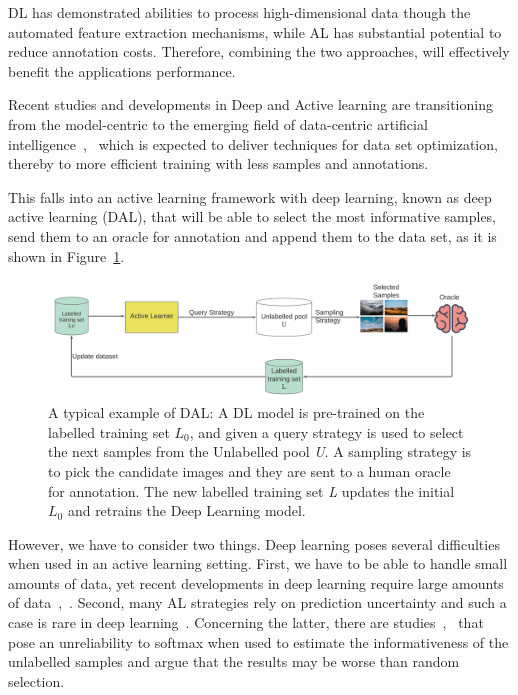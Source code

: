 DL has demonstrated abilities to process high-dimensional data though the automated feature extraction mechanisms, while AL has substantial potential to reduce annotation costs. Therefore, combining the two approaches, will effectively benefit the applications performance.

Recent studies and developments in Deep and Active learning are transitioning from the model-centric to the emerging field of data-centric artificial intelligence~\cite{bosser2020model},~\cite{motamedi2021datacentric} which is expected to deliver techniques for data set optimization, thereby to more efficient training with less samples and annotations. 

This falls into an active learning framework with deep learning, known as deep active learning (DAL), that will be able to select the most informative samples, send them to an oracle for annotation and append them to the data set, as it is shown in Figure~\ref{c4:fig_al_procedure}.

\begin{figure}[ht!]
    \centering  
    \includegraphics[width=\textwidth]{figures/chap5/al/al_map}
    \caption{A typical example of DAL: A DL model is pre-trained on the labelled training set \textit{$L_0$}, and given a query strategy is used to select the next samples from the Unlabelled pool \textit{U}. A sampling strategy is to pick the candidate images and they are sent to a human oracle for annotation. The new labelled training set \textit{L} updates the initial \textit{$L_0$} and retrains the Deep Learning model.}
    \label{c4:fig_al_procedure}
\end{figure}

However, we have to consider two things. Deep learning poses several difficulties when used in an active learning setting. First, we have to be able to handle small amounts of data, yet recent developments in deep learning require large amounts of data~\cite{krizhevsky2009learning},~\cite{krizhevsky2012imagenet}. Second, many AL strategies rely on prediction uncertainty and such a case is rare in deep learning~\cite{gal2017deep}.
Concerning the latter, there are studies~\cite{wang2014new},~\cite{wang2016cost} that pose an unreliability to softmax when used to estimate the informativeness of the unlabelled samples and argue that the results may be worse than random selection.

